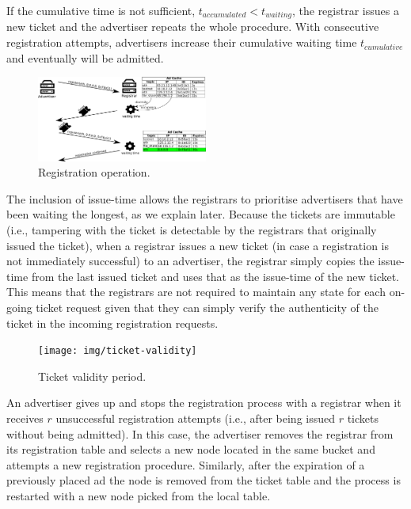 If the cumulative time is not sufficient, $t_\textit{accumulated} < t_\textit{waiting}$, the registrar issues a new ticket and the advertiser repeats the whole procedure. With consecutive registration attempts, advertisers increase their cumulative waiting time $t_\textit{cumulative}$ and eventually will be admitted. 



\begin{figure}
    \includegraphics[width=0.5\textwidth]{img/registration}
    \caption{Registration operation.}
    \label{fig:registration}
\end{figure}

The inclusion of issue-time allows the registrars to prioritise advertisers
that have been waiting the longest, as we explain later. Because the tickets
are immutable (i.e., tampering with the ticket is detectable by the registrars
that originally issued the ticket), when a registrar issues a new ticket (in
case a registration is not immediately successful) to an advertiser, the
registrar simply copies the issue-time from the last issued ticket and uses that as the issue-time of the new ticket. This means that the registrars are not required to maintain any state for each on-going ticket request given that they can simply verify the authenticity of the ticket in the incoming registration requests.


    
\begin{figure}
    \texttt{[image: img/ticket-validity]}
    \caption{Ticket validity period.}
    \label{fig:ticket_validity}
\end{figure}

An advertiser gives up and stops the registration process with a registrar when
it receives $r$ unsuccessful registration attempts (i.e., after being issued $r$
tickets without being admitted). In this case, the advertiser removes the registrar from its registration table and selects a new node located in the same bucket and attempts a new registration procedure.
Similarly,  after the expiration of a previously placed ad the node is removed from the ticket table and the process is restarted with a new node picked from the local table.

